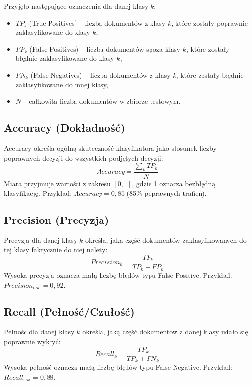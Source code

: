 \documentclass{article}
\begin{document}
Przyjęto następujące oznaczenia dla danej klasy $k$:
\begin{itemize}
    \item $TP_k$ (True Positives) – liczba dokumentów z klasy $k$, które zostały poprawnie zaklasyfikowane do klasy $k$,
    \item $FP_k$ (False Positives) – liczba dokumentów spoza klasy $k$, które zostały błędnie zaklasyfikowane do klasy $k$,
    \item $FN_k$ (False Negatives) – liczba dokumentów z klasy $k$, które zostały błędnie zaklasyfikowane do innej klasy,
    \item $N$ – całkowita liczba dokumentów w zbiorze testowym.
\end{itemize}

\subsection{Accuracy (Dokładność)}
Accuracy określa ogólną skuteczność klasyfikatora jako stosunek liczby poprawnych decyzji do wszystkich podjętych decyzji:
\begin{equation}
    Accuracy = \frac{\sum_{k} TP_k}{N}
\end{equation}
Miara przyjmuje wartości z zakresu $[0, 1]$, gdzie 1 oznacza bezbłędną klasyfikację.
Przykład: $Accuracy = 0{,}85$ (85\% poprawnych trafień).

\subsection{Precision (Precyzja)}
Precyzja dla danej klasy $k$ określa, jaka część dokumentów zaklasyfikowanych do tej klasy faktycznie do niej należy:
\begin{equation}
    Precision_k = \frac{TP_k}{TP_k + FP_k}
\end{equation}
Wysoka precyzja oznacza małą liczbę błędów typu False Positive.
Przykład: $Precision_{\texttt{usa}} = 0{,}92$.

\subsection{Recall (Pełność/Czułość)}
Pełność dla danej klasy $k$ określa, jaką część dokumentów z danej klasy udało się poprawnie wykryć:
\begin{equation}
    Recall_k = \frac{TP_k}{TP_k + FN_k}
\end{equation}
Wysoka pełność oznacza małą liczbę błędów typu False Negative.
Przykład: $Recall_{\texttt{usa}} = 0{,}88$.
\end{document}
